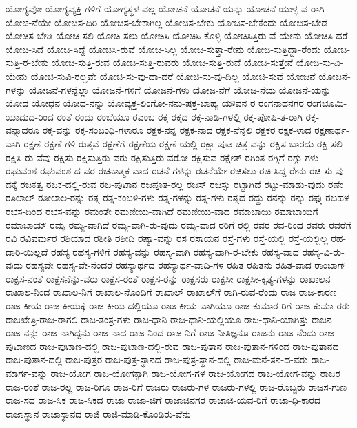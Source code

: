 {ಯೋಗ್ಯವೋ
ಯೋಗ್ಯವ್ಯಕ್ತಿ-ಗಳಿಗೆ
ಯೋಗ್ಯಸ್ಥಳ-ವಲ್ಲ
ಯೋಚನೆ
ಯೋಚನೆ-ಯನ್ನು
ಯೋಚನೆ-ಯುಳ್ಳ-ವ-ರಾಗಿ
ಯೋಚ-ನೆಯೇ
ಯೋಚಿಸ-ದಿರಿ
ಯೋಚಿಸ-ಬೇಕಾಗಿಲ್ಲ
ಯೋಚಿಸ-ಬೇಕು
ಯೋಚಿಸ-ಬೇಕೆಂದು
ಯೋಚಿಸ-ಬೇಡ
ಯೋಚಿಸ-ಬೇಡಿ
ಯೋಚಿ-ಸಲಿ
ಯೋಚಿ-ಸಲು
ಯೋಚಿಸಿ
ಯೋಚಿಸಿ-ಕೊಳ್ಳಿ
ಯೋಚಿಸಿತ್ತಿರು-ವೆ-ಯೇನು
ಯೋಚಿಸಿ-ದರೆ
ಯೋಚಿ-ಸಿದೆ
ಯೋಚಿ-ಸಿದ್ದೆ
ಯೋಚಿಸಿ-ರುವೆ
ಯೋಚಿ-ಸಿಲ್ಲ
ಯೋಚಿ-ಸುತ್ತಾ-ರೇನು
ಯೋಚಿ-ಸುತ್ತಿದ್ದಾ-ರೆಂದು
ಯೋಚಿ-ಸುತ್ತಿ-ರ-ಬೇಕು
ಯೋಚಿ-ಸುತ್ತಿ-ರುವ
ಯೋಚಿ-ಸುತ್ತಿ-ರುವರು
ಯೋಚಿ-ಸುತ್ತಿ-ರುವೆ
ಯೋಚಿ-ಸುತ್ತೇನೆ
ಯೋಚಿ-ಸು-ವಿ-ಯೇನು
ಯೋಚಿ-ಸುವಿ-ರಲ್ಲವೇ
ಯೋಚಿ-ಸು-ವು-ದಾ-ದರೆ
ಯೋಚಿ-ಸು-ವು-ದಿಲ್ಲ
ಯೋಚಿ-ಸುವೆ
ಯೋಜನೆ
ಯೋಜನೆ-ಗಳನ್ನು
ಯೋಜನೆ-ಗಳನ್ನೆಲ್ಲಾ
ಯೋಜನೆ-ಗಳಿಗೆ
ಯೋಜನೆ-ಗಳು
ಯೋಜ-ನೆಗೆ
ಯೋಜ-ನೆಯ
ಯೋಜನೆ-ಯನ್ನು
ಯೋಧ
ಯೋಧನ
ಯೋಧ-ನನ್ನು
ಯೋವ್ಯಕ್ತ-ಲಿಂಗೋ-ನನು-ಷಕ್ತ-ಬಾಹ್ಯ
ಯೌವನ
ರ
ರಂಗನಾಥನಗರ
ರಂಗಭೂಮಿ-ಯಾದುದ-ರಿಂದ
ರಂತೆ
ರಂದು
ರಂಬೆಯೂ
ರಎಂಬ
ರಕ್ತ
ರಕ್ತದ
ರಕ್ತ-ನಾಡಿ-ಗಳಲ್ಲಿ
ರಕ್ತ-ಪೋಷಿ-ತ-ರಾಗಿ
ರಕ್ತ-ವನ್ನಾದರೂ
ರಕ್ತ-ವನ್ನು
ರಕ್ತ-ಸಂಬಂಧಿ-ಗಳಾರೂ
ರಕ್ಷಕ-ನನ್ನ
ರಕ್ಷಕ-ನಾದ
ರಕ್ಷಕ-ನೆನ್ನಲಿ
ರಕ್ಷಕರ
ರಕ್ಷಕ-ಳಾದ
ರಕ್ಷಣಾರ್ಥ-ವಾಗಿ
ರಕ್ಷಣೆ
ರಕ್ಷಣೆ-ಗಳಿ-ರುತ್ತವೆ
ರಕ್ಷಣೆಗೆ
ರಕ್ಷಣೆಯ
ರಕ್ಷಣೆ-ಯಲ್ಲಿ
ರಕ್ಷಾ-ಪುಟ-ಚಿತ್ರ-ವನ್ನು
ರಕ್ಷಿಸ-ಬಾರದು
ರಕ್ಷಿ-ಸಲಿ
ರಕ್ಷಿಸಿ-ರು-ವೆವು
ರಕ್ಷಿಸು
ರಕ್ಷಿಸುತ್ತಿರು-ವರು
ರಕ್ಷಿಸುತ್ತಿರು-ವರೋ
ರಕ್ಷಿಸುವ
ರಕ್ಷೇತ್
ರಗಿಂತ
ರಗ್ಗಿಗೆ
ರಗ್ಗು-ಗಳು
ರಘುವಂಶ
ರಘುವಂಶ-ದ-ವರ
ರಚನಾತ್ಮಕ-ವಾದ
ರಚನೆ-ಗಳನ್ನು
ರಚನೆಯೇ
ರಚಿಸಲು
ರಚಿ-ಸಿದ್ದ-ರೇನು
ರಚಿ-ಸು-ವು-ದಕ್ಕೆ
ರಜಕತ್ವ
ರಜಕ-ದಲ್ಲಿ-ರುವ
ರಜ-ಪುಟಾನ
ರಜಪೂತ-ರಲ್ಲ
ರಜಸ್
ರಜಸ್ಸು
ರಟ್ಟಾಗಿದೆ
ರಟ್ಟು-ಮಾಡು-ವುದು
ರಣೇ
ರತಿಲಾಲ್
ರತೀಲಾಲ-ರನ್ನು
ರತ್ನ
ರತ್ನ-ಕಂಬಳಿ-ಗಳು
ರತ್ನ-ಗಳನ್ನು
ರತ್ನ-ಗಳು
ರತ್ನದ
ರದ್ದು
ರನನ್ನು
ರನ್ನು
ರಫ್ತು
ರಬಹಳ
ರಭಸ-ದಿಂದ
ರಭಸ-ವನ್ನು
ರಮಂತೇ
ರಮಣೀಯ-ವಾಗಿದೆ
ರಮಣೀಯ-ವಾದ
ರಮಾಬಾಯಿ
ರಮಾಬಾಯಿಗೆ
ರಮಾಬಾಯ್
ರಮ್ಯ
ರಮ್ಯ-ವಾಗಿದೆ
ರಮ್ಯ-ವಾಗಿ-ರು-ವುದು
ರಮ್ಯ-ವಾದ
ರರಿಗೆ
ರಲ್ಲಿ
ರವರ
ರವ-ರಿಂದ
ರವರು
ರವರೆಗೆ
ರವಿ
ರವಿವರ್ಮರ
ರಶಿಯಾದ
ರಶೀತಿ
ರಶೀದಿ
ರಷ್ಯಾ-ವನ್ನು
ರಸ
ರಸಾಯನ
ರಸ್ತೆ-ಗಳು
ರಸ್ತೆ-ಯಲ್ಲಿ
ರಸ್ತೆ-ಯಲ್ಲಿಲ್ಲ
ರಹ-ದಾರಿ-ಯಿಲ್ಲದೆ
ರಹಸ್ಯ
ರಹಸ್ಯ-ಗಳಿಗೆ
ರಹಸ್ಯ-ವನ್ನು
ರಹಸ್ಯ-ವಾಗಿ
ರಹಸ್ಯ-ವಾಗಿ-ರ-ಬೇಕು
ರಹಸ್ಯ-ವಾದ
ರಹಸ್ಯ-ವಿ-ರು-ವುದು
ರಹಸ್ಯವೇ
ರಹಸ್ಯ-ವೇ-ನೆಂದರೆ
ರಹಸ್ಯಾರ್ಥದ
ರಹಸ್ಯಾರ್ಥ-ವಾದಿ-ಗಳ
ರಹಿತ
ರಹಿತನು
ರಹಿತ-ವಾದ
ರಾಂಬಾಗ್
ರಾಕ್ಷಸ-ನಂತೆ
ರಾಕ್ಷಸನೆನ್ನು-ವರು
ರಾಕ್ಷಸ-ರಂತೆ
ರಾಕ್ಷಸ-ರನ್ನು
ರಾಕ್ಷಸರು
ರಾಕ್ಷಸೀ
ರಾಕ್ಷಸೀ-ಕೃತ್ಯ-ಗಳನ್ನು
ರಾಖಾಲನ
ರಾಖಾಲ-ನಿಂದ
ರಾಖಾಲ-ನಿಗೆ
ರಾಖಾಲ-ನೊಂದಿಗೆ
ರಾಖಾಲ್
ರಾಖಾಲ್‌ಗೆ
ರಾಗಿ-ರುವ-ರೆಂದು
ರಾಜ
ರಾಜ-ಕಾರಣ
ರಾಜ-ಕೀಯ
ರಾಜ-ಕೀಯಕ್ಕೆ
ರಾಜ-ಕೀಯ-ದಲ್ಲಿಯೂ
ರಾಜ-ಕೀಯ-ವಾಗಿಯೂ
ರಾಜ-ಕುಮಾರ-ರಿಗೆ
ರಾಜ-ಕುಮಾ-ರರು
ರಾಜಖೇತ್ರಿ-ರಾಜ-ರಾಗಲಿ
ರಾಜ-ತಂತ್ರ-ಗಳು
ರಾಜ-ಧಾನಿ
ರಾಜ-ಧಾನಿ-ಯಲ್ಲಿಯೂ
ರಾಜ-ಧಾನಿ-ಯಾಗಿತ್ತು
ರಾಜನ
ರಾಜ-ನನ್ನು
ರಾಜ-ನಾಗಿದ್ದನು
ರಾಜ-ನಾದ
ರಾಜ-ನಿಂದ
ರಾಜ-ನಿಗೆ
ರಾಜ-ನೀತಿಜ್ಞನೂ
ರಾಜನು
ರಾಜ-ನೆಂದು
ರಾಜ-ಪುಟಾಣದ
ರಾಜ-ಪುಟಾಣ-ದಲ್ಲಿ
ರಾಜ-ಪುಟಾಣ-ದಲ್ಲಿ-ರುವ
ರಾಜ-ಪುತಾನ
ರಾಜ-ಪುತಾನ-ಗಳಿಂದ
ರಾಜ-ಪುತಾನದ
ರಾಜ-ಪುತಾನ-ದಲ್ಲಿ
ರಾಜ-ಪುತ್ರರ
ರಾಜ-ಪುತ್ರ-ಸ್ಥಾನದ
ರಾಜ-ಪುತ್ರ-ಸ್ಥಾನ-ದಲ್ಲಿ
ರಾಜ-ಮನೆ-ತನ-ದ-ವರು
ರಾಜ-ಮಾರ್ಗ-ವನ್ನು
ರಾಜ-ಯೋಗ
ರಾಜ-ಯೋಗಕ್ಕಾಗಿ
ರಾಜ-ಯೋಗ-ಗಳ
ರಾಜ-ಯೋಗದ
ರಾಜ-ಯೋಗ-ವನ್ನು
ರಾಜರ
ರಾಜ-ರಂತೆ
ರಾಜ-ರಲ್ಲ
ರಾಜ-ರಿಗೂ
ರಾಜ-ರಿಗೆ
ರಾಜರು
ರಾಜರು-ಗಳ
ರಾಜರು-ಗಳಲ್ಲಿ
ರಾಜ-ರೊಬ್ಬರು
ರಾಜಸ-ಗುಣ
ರಾಜ-ಸದ
ರಾಜ-ಸಿಕ
ರಾಜ-ಸಿಕದ
ರಾಜಾ
ರಾಜಾ-ಜಿಗೆ
ರಾಜಾಜಿನಗರ
ರಾಜಾಜಿ-ಯವ-ರಿಗೆ
ರಾಜಾ-ಧಿ-ಕಾರದ
ರಾಜಾಸ್ಥಾನ
ರಾಜಾಸ್ಥಾನದ
ರಾಜಿ
ರಾಜಿ-ಮಾಡಿ-ಕೊಂಡಿರು-ವೆನು
}
